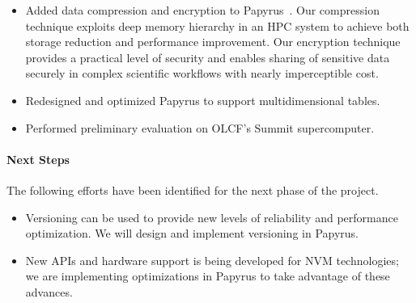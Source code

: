 \begin{itemize}
\item %
  Added data compression and encryption to Papyrus~\cite{Kim:2019:IED}.
  Our compression technique exploits deep memory hierarchy in an HPC system to achieve both storage reduction and performance improvement.
  Our encryption technique provides a practical level of security and enables sharing of sensitive data securely in complex scientific workflows with nearly imperceptible cost.
\item %
  Redesigned and optimized Papyrus to support multidimensional tables.
\item %
  Performed preliminary evaluation on OLCF's Summit supercomputer.
\end{itemize}

\paragraph{Next Steps}
The following efforts have been identified for the next phase of the project.
\begin{itemize}
\item %
Versioning can be used to provide new levels of reliability and performance optimization. We will design and implement versioning in Papyrus.

\item %
New APIs and hardware support is being developed for NVM technologies; we are implementing optimizations in Papyrus to take advantage of these advances.

\end{itemize}
